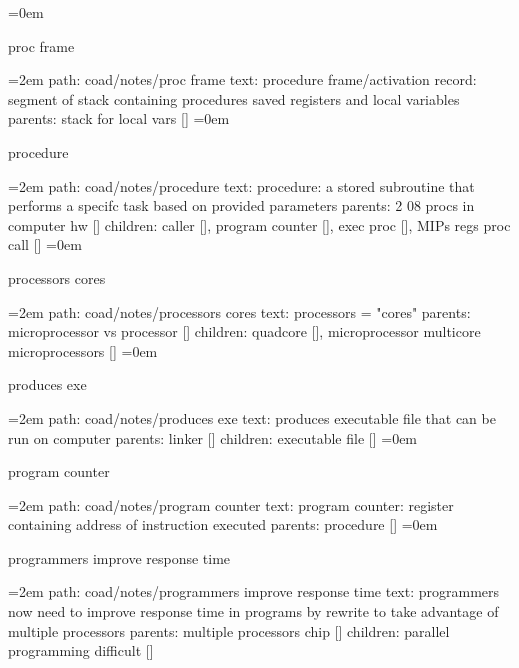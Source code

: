 \smallskip
\leftskip=0em
\par\endgroup
\bigskip
{}
proc frame
\smallskip
\par\begingroup
\leftskip=2em
path: coad/notes/proc frame
\smallskip
text:  procedure frame/activation record: segment of stack containing procedures saved registers and local variables
\smallskip
parents:  stack for local vars []
\smallskip
\leftskip=0em
\par\endgroup
\bigskip
{}
procedure
\smallskip
\par\begingroup
\leftskip=2em
path: coad/notes/procedure
\smallskip
text:  procedure: a stored subroutine that performs a specifc task based on provided parameters
\smallskip
parents:  2 08 procs in computer hw []
\smallskip
children: caller [], program counter [], exec proc [], MIPs regs proc call []
\smallskip
\leftskip=0em
\par\endgroup
\bigskip
{}
processors cores
\smallskip
\par\begingroup
\leftskip=2em
path: coad/notes/processors cores
\smallskip
text:  processors = "cores"
\smallskip
parents:  microprocessor vs processor []
\smallskip
children: quadcore [], microprocessor multicore microprocessors []
\smallskip
\leftskip=0em
\par\endgroup
\bigskip
{}
produces exe
\smallskip
\par\begingroup
\leftskip=2em
path: coad/notes/produces exe
\smallskip
text:  produces executable file that can be run on computer
\smallskip
parents:  linker []
\smallskip
children: executable file []
\smallskip
\leftskip=0em
\par\endgroup
\bigskip
{}
program counter
\smallskip
\par\begingroup
\leftskip=2em
path: coad/notes/program counter
\smallskip
text:  program counter: register containing address of instruction executed
\smallskip
parents:  procedure []
\smallskip
\leftskip=0em
\par\endgroup
\bigskip
{}
programmers improve response time
\smallskip
\par\begingroup
\leftskip=2em
path: coad/notes/programmers improve response time
\smallskip
text:  programmers now need to improve response time in programs by rewrite to take advantage of multiple processors
\smallskip
parents:  multiple processors chip []
\smallskip
children: parallel programming difficult []
